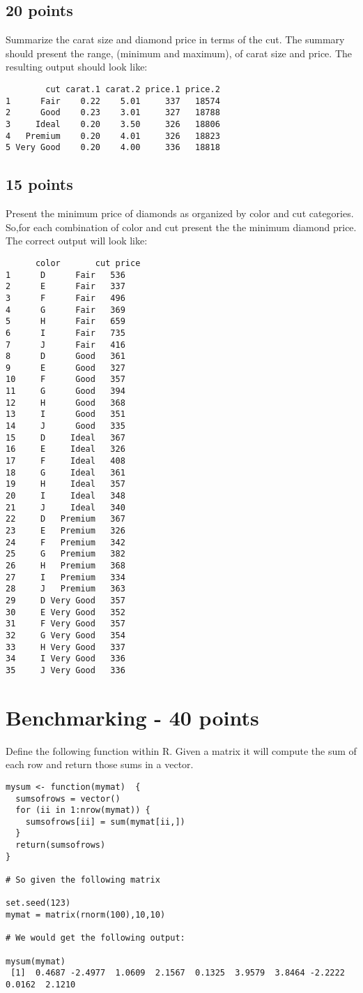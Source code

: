 \documentclass{article}
\begin{document}
\subsection{20 points}Summarize the carat size and diamond price in terms of the cut. The summary should present the range, (minimum and maximum), of carat size and price. The resulting output should look like:

\begin{verbatim}
        cut carat.1 carat.2 price.1 price.2
1      Fair    0.22    5.01     337   18574
2      Good    0.23    3.01     327   18788
3     Ideal    0.20    3.50     326   18806
4   Premium    0.20    4.01     326   18823
5 Very Good    0.20    4.00     336   18818
\end{verbatim}

\subsection{15 points} Present the minimum price of diamonds as organized by color and cut categories. So,for each combination of color and cut present the the minimum diamond price. The correct output will look like:

\begin{footnotesize}
\begin{verbatim}
      color       cut price
1      D      Fair   536
2      E      Fair   337
3      F      Fair   496
4      G      Fair   369
5      H      Fair   659
6      I      Fair   735
7      J      Fair   416
8      D      Good   361
9      E      Good   327
10     F      Good   357
11     G      Good   394
12     H      Good   368
13     I      Good   351
14     J      Good   335
15     D     Ideal   367
16     E     Ideal   326
17     F     Ideal   408
18     G     Ideal   361
19     H     Ideal   357
20     I     Ideal   348
21     J     Ideal   340
22     D   Premium   367
23     E   Premium   326
24     F   Premium   342
25     G   Premium   382
26     H   Premium   368
27     I   Premium   334
28     J   Premium   363
29     D Very Good   357
30     E Very Good   352
31     F Very Good   357
32     G Very Good   354
33     H Very Good   337
34     I Very Good   336
35     J Very Good   336
\end{verbatim}
\end{footnotesize}

\section{Benchmarking - 40 points}
Define the following function within R. Given a matrix it will compute the sum of each row and return those sums in a vector. 
\begin{verbatim}
mysum <- function(mymat)  {
  sumsofrows = vector()
  for (ii in 1:nrow(mymat)) {
    sumsofrows[ii] = sum(mymat[ii,])
  }
  return(sumsofrows)
}

# So given the following matrix 

set.seed(123)
mymat = matrix(rnorm(100),10,10)

# We would get the following output:

mysum(mymat)
 [1]  0.4687 -2.4977  1.0609  2.1567  0.1325  3.9579  3.8464 -2.2222  0.0162  2.1210
\end{verbatim}
\end{document}
